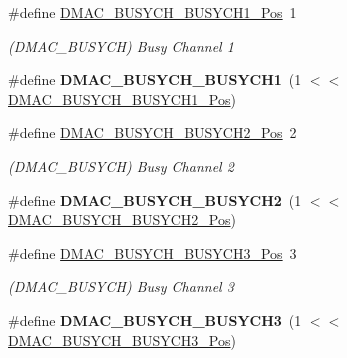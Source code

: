 \begin{DoxyCompactItemize}
\item 
\hypertarget{group___s_a_m_l21___d_m_a_c_ga039058659d9c492c44fa895f9ef9f5cf}{}\#define \hyperlink{group___s_a_m_l21___d_m_a_c_ga039058659d9c492c44fa895f9ef9f5cf}{D\+M\+A\+C\+\_\+\+B\+U\+S\+Y\+C\+H\+\_\+\+B\+U\+S\+Y\+C\+H1\+\_\+\+Pos}~1\label{group___s_a_m_l21___d_m_a_c_ga039058659d9c492c44fa895f9ef9f5cf}

\begin{DoxyCompactList}\small\item\em (D\+M\+A\+C\+\_\+\+B\+U\+S\+Y\+C\+H) Busy Channel 1 \end{DoxyCompactList}\item 
\hypertarget{group___s_a_m_l21___d_m_a_c_gafd30c3fd32f2906d193b32471207198a}{}\#define {\bfseries D\+M\+A\+C\+\_\+\+B\+U\+S\+Y\+C\+H\+\_\+\+B\+U\+S\+Y\+C\+H1}~(1 $<$$<$ \hyperlink{group___s_a_m_l21___d_m_a_c_ga039058659d9c492c44fa895f9ef9f5cf}{D\+M\+A\+C\+\_\+\+B\+U\+S\+Y\+C\+H\+\_\+\+B\+U\+S\+Y\+C\+H1\+\_\+\+Pos})\label{group___s_a_m_l21___d_m_a_c_gafd30c3fd32f2906d193b32471207198a}

\item 
\hypertarget{group___s_a_m_l21___d_m_a_c_ga522fc3723f937ce4f5fa8643a266ace1}{}\#define \hyperlink{group___s_a_m_l21___d_m_a_c_ga522fc3723f937ce4f5fa8643a266ace1}{D\+M\+A\+C\+\_\+\+B\+U\+S\+Y\+C\+H\+\_\+\+B\+U\+S\+Y\+C\+H2\+\_\+\+Pos}~2\label{group___s_a_m_l21___d_m_a_c_ga522fc3723f937ce4f5fa8643a266ace1}

\begin{DoxyCompactList}\small\item\em (D\+M\+A\+C\+\_\+\+B\+U\+S\+Y\+C\+H) Busy Channel 2 \end{DoxyCompactList}\item 
\hypertarget{group___s_a_m_l21___d_m_a_c_ga2a97fe3b06f7b3d7d88105fabe9df422}{}\#define {\bfseries D\+M\+A\+C\+\_\+\+B\+U\+S\+Y\+C\+H\+\_\+\+B\+U\+S\+Y\+C\+H2}~(1 $<$$<$ \hyperlink{group___s_a_m_l21___d_m_a_c_ga522fc3723f937ce4f5fa8643a266ace1}{D\+M\+A\+C\+\_\+\+B\+U\+S\+Y\+C\+H\+\_\+\+B\+U\+S\+Y\+C\+H2\+\_\+\+Pos})\label{group___s_a_m_l21___d_m_a_c_ga2a97fe3b06f7b3d7d88105fabe9df422}

\item 
\hypertarget{group___s_a_m_l21___d_m_a_c_ga9e477848fd14fa9c76720ad3efc9c368}{}\#define \hyperlink{group___s_a_m_l21___d_m_a_c_ga9e477848fd14fa9c76720ad3efc9c368}{D\+M\+A\+C\+\_\+\+B\+U\+S\+Y\+C\+H\+\_\+\+B\+U\+S\+Y\+C\+H3\+\_\+\+Pos}~3\label{group___s_a_m_l21___d_m_a_c_ga9e477848fd14fa9c76720ad3efc9c368}

\begin{DoxyCompactList}\small\item\em (D\+M\+A\+C\+\_\+\+B\+U\+S\+Y\+C\+H) Busy Channel 3 \end{DoxyCompactList}\item 
\hypertarget{group___s_a_m_l21___d_m_a_c_gab26497f77db0f273adc00e02a627809e}{}\#define {\bfseries D\+M\+A\+C\+\_\+\+B\+U\+S\+Y\+C\+H\+\_\+\+B\+U\+S\+Y\+C\+H3}~(1 $<$$<$ \hyperlink{group___s_a_m_l21___d_m_a_c_ga9e477848fd14fa9c76720ad3efc9c368}{D\+M\+A\+C\+\_\+\+B\+U\+S\+Y\+C\+H\+\_\+\+B\+U\+S\+Y\+C\+H3\+\_\+\+Pos})\label{group___s_a_m_l21___d_m_a_c_gab26497f77db0f273adc00e02a627809e}


\end{DoxyCompactItemize}

